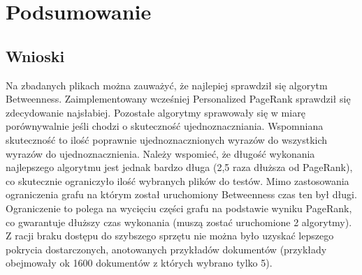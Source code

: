 \chapter{Podsumowanie}
\section{Wnioski}
Na zbadanych plikach można zauważyć, że najlepiej sprawdził się algorytm Betweenness. Zaimplementowany wcześniej Personalized PageRank sprawdził się zdecydowanie najsłabiej. Pozostałe algorytmy sprawowały się w miarę porównywalnie jeśli chodzi o skuteczność ujednoznaczniania. Wspomniana skuteczność to ilość poprawnie ujednoznacznionych wyrazów do wszystkich wyrazów do ujednoznacznienia. Należy wspomieć, że długość wykonania najlepszego algorytmu jest jednak bardzo długa (2,5 raza dłuższa od PageRank), co skutecznie ograniczyło ilość wybranych plików do testów. Mimo zastosowania ograniczenia grafu na którym został uruchomiony Betweenness czas ten był długi. Ograniczenie to polega na wycięciu części grafu na podstawie wyniku PageRank, co gwarantuje dłuższy czas wykonania (muszą zostać uruchomione 2 algorytmy). Z racji braku dostępu do szybszego sprzętu nie można było uzyskać lepszego pokrycia dostarczonych, anotowanych przykładów dokumentów (przykłady obejmowały ok 1600 dokumentów z których wybrano tylko 5).
